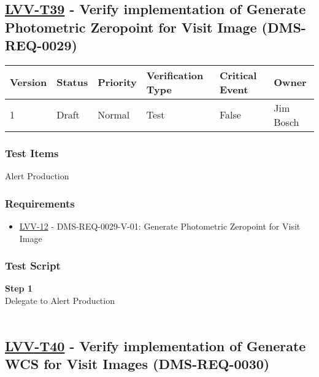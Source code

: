 \hypertarget{lvv-t39---verify-implementation-of-generate-photometric-zeropoint-for-visit-image-dms-req-0029}{%
\subsection{\texorpdfstring{\href{https://jira.lsstcorp.org/secure/Tests.jspa\#/testCase/LVV-T39}{LVV-T39}
- Verify implementation of Generate Photometric Zeropoint for Visit
Image
(DMS-REQ-0029)}{LVV-T39 - Verify implementation of Generate Photometric Zeropoint for Visit Image (DMS-REQ-0029)}}\label{lvv-t39---verify-implementation-of-generate-photometric-zeropoint-for-visit-image-dms-req-0029}}

\begin{longtable}[]{@{}llllll@{}}
\toprule
Version & Status & Priority & Verification Type & Critical Event &
Owner\tabularnewline
\midrule
\endhead
1 & Draft & Normal & Test & False & Jim Bosch\tabularnewline
\bottomrule
\end{longtable}

\hypertarget{test-items-15}{%
\subsubsection{Test Items}\label{test-items-15}}

Alert Production~

\hypertarget{requirements-16}{%
\subsubsection{Requirements}\label{requirements-16}}

\begin{itemize}
\tightlist
\item
  \href{https://jira.lsstcorp.org/browse/LVV-12}{LVV-12} -
  DMS-REQ-0029-V-01: Generate Photometric Zeropoint for Visit Image
\end{itemize}

\hypertarget{test-script-16}{%
\subsubsection{Test Script}\label{test-script-16}}

\textbf{Step 1}\\
Delegate to Alert Production\\
~\\

\hypertarget{lvv-t40---verify-implementation-of-generate-wcs-for-visit-images-dms-req-0030}{%
\subsection{\texorpdfstring{\href{https://jira.lsstcorp.org/secure/Tests.jspa\#/testCase/LVV-T40}{LVV-T40}
- Verify implementation of Generate WCS for Visit Images
(DMS-REQ-0030)}{LVV-T40 - Verify implementation of Generate WCS for Visit Images (DMS-REQ-0030)}}\label{lvv-t40---verify-implementation-of-generate-wcs-for-visit-images-dms-req-0030}}

